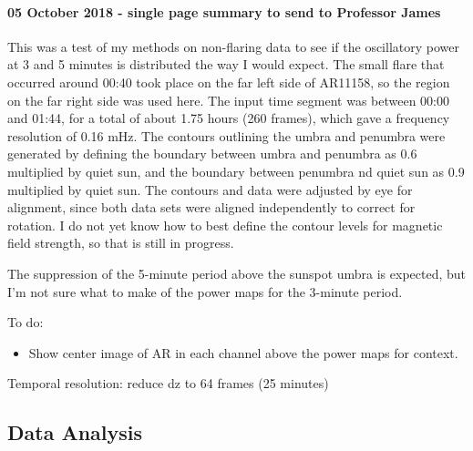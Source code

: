 \clearpage

\paragraph{05 October 2018 - single page summary to send to Professor James}
This was a test of my methods on non-flaring data to see if the
oscillatory power at 3 and 5 minutes is distributed the way I would expect.
The small flare that occurred around 00:40 took place on the far left
side of AR11158, so the region on the far right side was used here.
The input time segment was between 00:00 and 01:44, for a total of
about 1.75 hours (260 frames), which gave a frequency resolution of
0.16 mHz.
The contours outlining the umbra and penumbra were generated by defining
the boundary between umbra and penumbra as 0.6 multiplied by quiet sun,
and the boundary between penumbra nd quiet sun as 0.9 multiplied by quiet sun.
The contours and data were adjusted by eye for alignment, since both data
sets were aligned independently to correct for rotation.
I do not yet know how to best define the contour levels for magnetic field
strength, so that is still in progress.

The suppression of the 5-minute period above the sunspot umbra is expected,
but I'm not sure what to make of the power maps for the 3-minute period.

To do:
\begin{itemize}
    \item Show center image of AR in each channel above the power maps for
        context.
\end{itemize}

\clearpage

Temporal resolution: reduce dz to 64 frames (25 minutes)

\subsection{Data Analysis}

